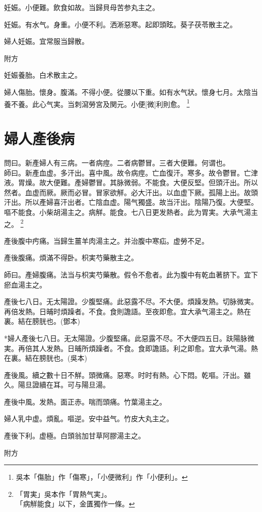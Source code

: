 \documentclass[12pt,oneside,UTF8,b5paper]{ctexbook}她她她她她她她
\begin{document}
妊娠。小便難。飲食如故。当歸貝母苦参丸主之。

妊娠。有水气。身重。小便不利。洒淅惡寒。起即頭眩。葵子茯苓散主之。

婦人妊娠。宜常服当歸散。

附方

妊娠養胎。白术散主之。

婦人傷胎。懷身。腹滿。不得小便。從腰以下重。如有水气狀。懷身七月。太陰当養不養。此心气実。当刺瀉勞宮及関元。小便[微]利則愈。
	\footnote{吳本「傷胎」作「傷寒」，「小便微利」作「小便利」。}

\chapter{婦人產後病}

問曰。新產婦人有三病。一者病痙。二者病鬱冒。三者大便難。何谓也。\\
師曰。新產血虚。多汗出。喜中風。故令病痙。亡血復汗。寒多。故令鬱冒。亡津液。胃燥。故大便難。產婦鬱冒。其脉微弱。不能食。大便反堅。但頭汗出。所以然者。血虚而厥。厥而必冒。冒家欲觧。必大汗出。以血虚下厥。孤陽上出。故頭汗出。所以產婦喜汗出者。亡陰血虚。陽气獨盛。故当汗出。陰陽乃復。大便堅。嘔不能食。小柴胡湯主之。病觧。能食。七八日更发熱者。此为胃実。大承气湯主之。
	\footnote{「胃実」吳本作「胃熱气実」。\\「病觧能食」以下，金匱獨作一條。}

產後腹中㽲痛。当歸生薑羊肉湯主之。并治腹中寒疝。虚勞不足。

產後腹痛。煩滿不得卧。枳実芍藥散主之。

師曰。產婦腹痛。法当与枳実芍藥散。假令不愈者。此为腹中有乾血著脐下。宜下瘀血湯主之。

產後七八日。无太陽證。少腹堅痛。此惡露不尽。不大便。煩躁发熱。切脉微実。再倍发熱。日晡时煩躁者。不食。食則譫語。至夜即愈。宜大承气湯主之。熱在裏。結在膀胱也。(鄧本)

*婦人產後七八日。无太陽證。少腹堅痛。此惡露不尽。不大便四五日。趺陽脉微実。再倍其人发熱。日晡所煩躁者。不食。食即譫語。利之即愈。宜大承气湯。熱在裏。結在膀胱也。(吳本)

產後風。續之數十日不觧。頭微痛。惡寒。时时有熱。心下悶。乾嘔。汗出。雖久。陽旦證續在耳。可与陽旦湯。

產後中風。发熱。面正赤。喘而頭痛。竹葉湯主之。

婦人乳中虚。煩亂。嘔逆。安中益气。竹皮大丸主之。

產後下利。虚極。白頭翁加甘草阿膠湯主之。

附方
\end{document}
